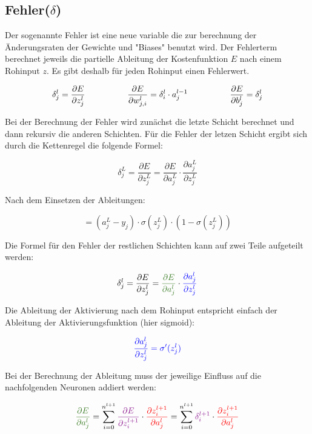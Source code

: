 \documentclass{article}
\begin{document}
\subsection{Fehler($\delta$)}
\begin{flushleft}
Der sogenannte Fehler ist eine neue variable die zur berechnung der Änderungsraten der Gewichte und "Biases" benutzt wird.
Der Fehlerterm berechnet jeweils die partielle Ableitung der Kostenfunktion $E$ nach einem Rohinput $z$. Es gibt deshalb
für jeden Rohinput einen Fehlerwert.
\end{flushleft}
\[ \delta_j^l = \frac{\partial E}{\partial z_j^l} 
\kern 50pt
 \frac{\partial E}{\partial w_{j,i}^l} = \delta_i^l \cdot a_j^{l-1}
\kern 50pt
\frac{\partial E}{\partial b_j^l} = \delta_j^l \]
\begin{flushleft}
Bei der Berechnung der Fehler wird zunächst die letzte Schicht berechnet und dann rekursiv die anderen Schichten.
Für die Fehler der letzen Schicht ergibt sich durch die Kettenregel die folgende Formel:
\end{flushleft}
\[ \delta_j^L  = \frac{\partial E}{\partial z_j^L}
= \frac{\partial E}{\partial a_j^L} \cdot \frac{\partial a_j^L}{\partial z_j^L}\]
\begin{flushleft}
Nach dem Einsetzen der Ableitungen:
\end{flushleft}
\[ = (a_j^L - y_j) \cdot \sigma (z_j^L) \cdot (1 - \sigma (z_j^L)) \]
\begin{flushleft}
Die Formel für den Fehler der restlichen Schichten kann auf zwei Teile aufgeteilt werden:
\end{flushleft}
\[ \delta_j^{l}  = \frac{\partial E}{\partial z_j^{l}} 
= \textcolor{OliveGreen}{\frac{\partial E}{\partial a_j^{l}}} \cdot \textcolor{blue}{\frac{\partial a_j^{l}}{\partial z_j^{l}}} \]
\begin{flushleft}
    Die Ableitung der Aktivierung nach dem Rohinput entspricht einfach der Ableitung der Aktivierungsfunktion (hier sigmoid):
\end{flushleft}
\[ \textcolor{blue}{\frac{\partial a_j^{l}}{\partial z_j^{l}} = \sigma^{\prime}(z_j^{l})} \]
\begin{flushleft}
    Bei der Berechnung der Ableitung muss der jeweilige Einfluss auf die nachfolgenden Neuronen addiert werden:
\end{flushleft}
\[ \textcolor{OliveGreen}{ \frac{\partial E}{\partial a_j^{l}}} = \sum_{i 
= 0}^{n^{l+1}} \textcolor{Plum}{\frac{\partial E}{\partial z_i^{l+1}}} \cdot \textcolor{red}{\frac{\partial z_i^{l+1}}{\partial a_j^{l}}} 
= \sum_{i = 0}^{n^{l+1}} \textcolor{Plum}{\delta_i^{l+1}} \cdot \textcolor{red}{ \frac{\partial z_i^{l+1}}{\partial a_j^{l}} } \]
\end{document}
